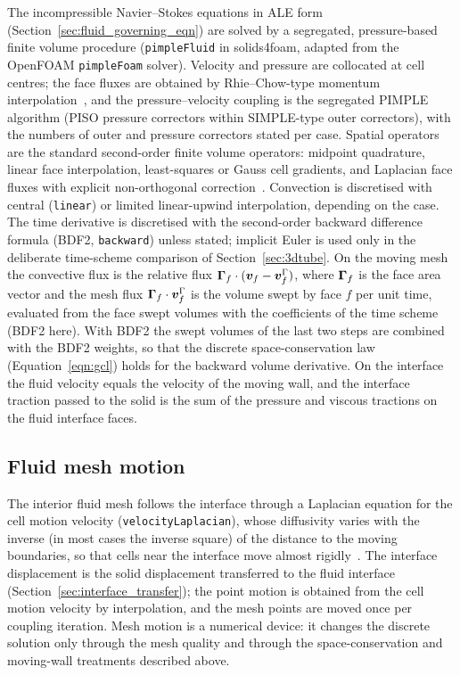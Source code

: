 The incompressible Navier--Stokes equations in ALE form (Section~\ref{sec:fluid_governing_eqn}) are solved by a segregated, pressure-based finite volume procedure (\texttt{pimpleFluid} in solids4foam, adapted from the OpenFOAM \texttt{pimpleFoam} solver).
Velocity and pressure are collocated at cell centres; the face fluxes are obtained by Rhie--Chow-type momentum interpolation~\citep{Rhie1983}, and the pressure--velocity coupling is the segregated PIMPLE algorithm (PISO pressure correctors within SIMPLE-type outer correctors), with the numbers of outer and pressure correctors stated per case.
Spatial operators are the standard second-order finite volume operators: midpoint quadrature, linear face interpolation, least-squares or Gauss cell gradients, and Laplacian face fluxes with explicit non-orthogonal correction~\citep{Jasak1996}.
Convection is discretised with central (\texttt{linear}) or limited linear-upwind interpolation, depending on the case.
The time derivative is discretised with the second-order backward difference formula (BDF2, \texttt{backward}) unless stated; implicit Euler is used only in the deliberate time-scheme comparison of Section~\ref{sec:3dtube}.
On the moving mesh the convective flux is the relative flux $\boldsymbol{\Gamma}_f\cdot(\boldsymbol{v}_f - \boldsymbol{v}^\Gamma_f)$, where $\boldsymbol{\Gamma}_f$ is the face area vector and the mesh flux $\boldsymbol{\Gamma}_f\cdot\boldsymbol{v}^\Gamma_f$ is the volume swept by face $f$ per unit time, evaluated from the face swept volumes with the coefficients of the time scheme (BDF2 here).
With BDF2 the swept volumes of the last two steps are combined with the BDF2 weights, so that the discrete space-conservation law (Equation~\eqref{eqn:gcl}) holds for the backward volume derivative.
On the interface the fluid velocity equals the velocity of the moving wall, and the interface traction passed to the solid is the sum of the pressure and viscous tractions on the fluid interface faces.

\subsection{Fluid mesh motion}\label{sec:fluid_mesh_motion}

The interior fluid mesh follows the interface through a Laplacian equation for the cell motion velocity (\texttt{velocityLaplacian}), whose diffusivity varies with the inverse (in most cases the inverse square) of the distance to the moving boundaries, so that cells near the interface move almost rigidly~\citep{Tukovic2018}.
The interface displacement is the solid displacement transferred to the fluid interface (Section~\ref{sec:interface_transfer}); the point motion is obtained from the cell motion velocity by interpolation, and the mesh points are moved once per coupling iteration.
Mesh motion is a numerical device: it changes the discrete solution only through the mesh quality and through the space-conservation and moving-wall treatments described above.


